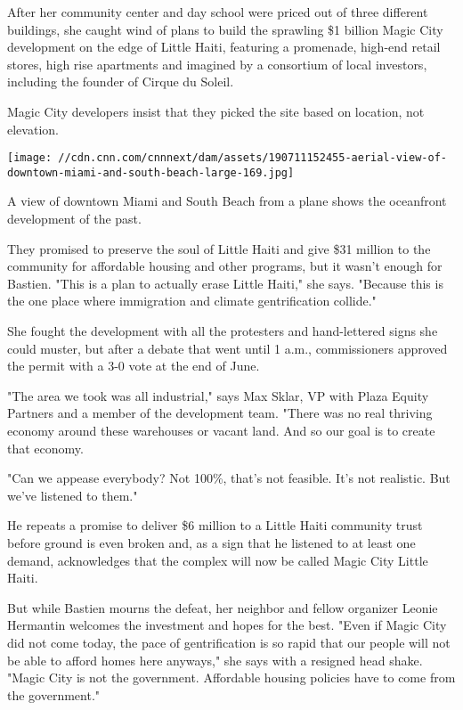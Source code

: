After her community center and day school were priced out of three
different buildings, she caught wind of plans to build the sprawling \$1
billion Magic City development on the edge of Little Haiti, featuring a
promenade, high-end retail stores, high rise apartments and imagined by
a consortium of local investors, including the founder of Cirque du
Soleil.

Magic City developers insist that they picked the site based on
location, not elevation.

\texttt{[image: //cdn.cnn.com/cnnnext/dam/assets/190711152455-aerial-view-of-downtown-miami-and-south-beach-large-169.jpg]}

A view of downtown Miami and South Beach from a plane shows the
oceanfront development of the past.

They promised to preserve the soul of Little Haiti and give \$31 million
to the community for affordable housing and other programs, but it
wasn't enough for Bastien. "This is a plan to actually erase Little
Haiti," she says. "Because this is the one place where immigration and
climate gentrification collide."

She fought the development with all the protesters and hand-lettered
signs she could muster, but after a debate that went until 1 a.m.,
commissioners approved the permit with a 3-0 vote at the end of June.

"The area we took was all industrial," says Max Sklar, VP with Plaza
Equity Partners and a member of the development team. "There was no real
thriving economy around these warehouses or vacant land. And so our goal
is to create that economy.

"Can we appease everybody? Not 100\%, that's not feasible. It's not
realistic. But we've listened to them."

He repeats a promise to deliver \$6 million to a Little Haiti community
trust before ground is even broken and, as a sign that he listened to at
least one demand, acknowledges that the complex will now be called Magic
City Little Haiti.

But while Bastien mourns the defeat, her neighbor and fellow organizer
Leonie Hermantin welcomes the investment and hopes for the best. "Even
if Magic City did not come today, the pace of gentrification is so rapid
that our people will not be able to afford homes here anyways," she says
with a resigned head shake. "Magic City is not the government.
Affordable housing policies have to come from the government."

